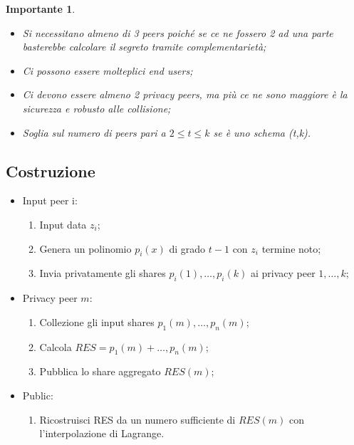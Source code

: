 \documentclass{book}
\newtheorem*{Importante}{\textbf{Importante}}
\begin{document}
\begin{Importante}
    \begin{itemize}
        \item Si necessitano almeno di 3 peers poiché se ce ne fossero 2 ad una parte basterebbe calcolare il segreto tramite complementarietà;
        \item Ci possono essere molteplici end users;
        \item Ci devono essere almeno 2 privacy peers, ma più ce ne sono maggiore è la sicurezza e robusto alle collisione;
        \item Soglia sul numero di peers pari a \(2\leq t\leq k\) se è uno schema (t,k).
    \end{itemize}
\end{Importante}
\subsection{Costruzione}
\begin{itemize}
    \item Input peer i:\begin{enumerate}
              \item Input data \(z_{i}\);
              \item Genera un polinomio \(p_{i}(x)\) di grado \(t-1\) con \(z_{i}\) termine noto;
              \item Invia privatamente gli shares \(p_{i}(1),\dots,p_{i}(k)\) ai privacy peer \(1,\dots,k\);
          \end{enumerate}
    \item Privacy peer \(m\):\begin{enumerate}
              \item Collezione gli input shares \(p_{1}(m),\dots,p_{n}(m)\);
              \item Calcola \(RES=p_{1}(m)+\dots,p_{n}(m)\);
              \item Pubblica lo share aggregato \(RES(m)\);
          \end{enumerate}
    \item Public:\begin{enumerate}
              \item Ricostruisci RES da un numero sufficiente di \(RES(m)\) con l'interpolazione di Lagrange.
          \end{enumerate}
\end{itemize}
\end{document}
